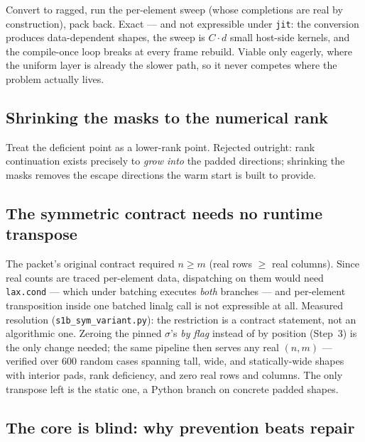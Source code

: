 \documentclass[11pt]{article}
\theoremstyle{definition}
\theoremstyle{remark}
\newcommand{\code}[1]{\texttt{#1}}
\begin{document}
Convert to ragged, run the per-element sweep (whose completions are real by construction), pack
back. Exact --- and not expressible under \code{jit}: the conversion produces data-dependent
shapes, the sweep is $C\cdot d$ small host-side kernels, and the compile-once loop breaks at every
frame rebuild. Viable only eagerly, where the uniform layer is already the slower path, so it never
competes where the problem actually lives.

\subsection{Shrinking the masks to the numerical rank}\label{app:shrink}

Treat the deficient point as a lower-rank point. Rejected outright: rank continuation exists
precisely to \emph{grow into} the padded directions; shrinking the masks removes the escape
directions the warm start is built to provide.

\subsection{The symmetric contract needs no runtime transpose}\label{app:sym}

The packet's original contract required $n\ge m$ (real rows $\ge$ real columns). Since real counts
are traced per-element data, dispatching on them would need \code{lax.cond} --- which under
batching executes \emph{both} branches --- and per-element transposition inside one batched linalg
call is not expressible at all. Measured resolution (\code{s1b\_sym\_variant.py}): the restriction
is a contract statement, not an algorithmic one. Zeroing the pinned $\sigma$'s \emph{by flag}
instead of by position (Step~3) is the only change needed; the same pipeline then serves any real
$(n,m)$ --- verified over 600 random cases spanning tall, wide, and statically-wide shapes with
interior pads, rank deficiency, and zero real rows and columns. The only transpose left is the
static one, a Python branch on concrete padded shapes.

\subsection{The core is blind: why prevention beats repair}\label{app:blind}
\end{document}

